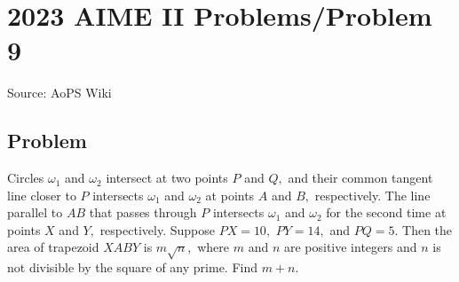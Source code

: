 \documentclass[12pt]{article}
\begin{document}
\section*{{2023 AIME II Problems/Problem 9}}
Source: AoPS Wiki

\subsection*{Problem}
Circles $\omega_1$ and $\omega_2$ intersect at two points $P$ and $Q,$ and their common tangent line closer to $P$ intersects $\omega_1$ and $\omega_2$ at points $A$ and $B,$ respectively. The line parallel to $AB$ that passes through $P$ intersects $\omega_1$ and $\omega_2$ for the second time at points $X$ and $Y,$ respectively. Suppose $PX=10,$ $PY=14,$ and $PQ=5.$ Then the area of trapezoid $XABY$ is $m\sqrt{n},$ where $m$ and $n$ are positive integers and $n$ is not divisible by the square of any prime. Find $m+n.$
\end{document}
